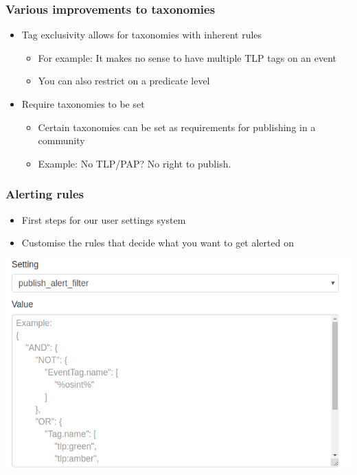 \begin{frame}
  \frametitle{Various improvements to taxonomies}
  \begin{itemize}
    \item Tag exclusivity allows for taxonomies with inherent rules
    \begin{itemize}
      \item For example: It makes no sense to have multiple TLP tags on an event
      \item You can also restrict on a predicate level
    \end{itemize}
    \item Require taxonomies to be set
    \begin{itemize}
      \item Certain taxonomies can be set as requirements for publishing in a community
      \item Example: No TLP/PAP? No right to publish.
    \end{itemize}
  \end{itemize}
\end{frame}

\begin{frame}
  \frametitle{Alerting rules}
  \begin{itemize}
    \item First steps for our user settings system
    \item Customise the rules that decide what you want to get alerted on
  \end{itemize}
  \begin{center}
    \includegraphics[width=0.8\linewidth]{publish_alert.png}
  \end{center}
\end{frame}

